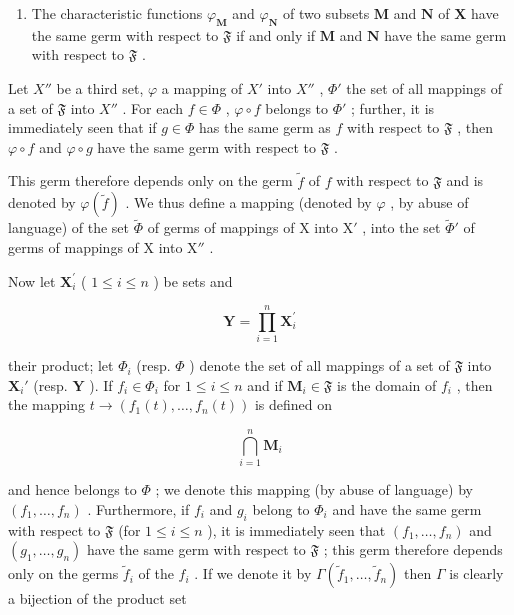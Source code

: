 \begin{enumerate}
\def\labelenumi{\arabic{enumi})}
\setcounter{enumi}{1}
\tightlist
\item
  The characteristic functions \(\varphi_{\mathbf{M}}\) and \(\varphi_{\mathbf{N}}\) of two subsets \(\mathbf{M}\) and \(\mathbf{N}\) of \(\mathbf{X}\) have the same germ with respect to \(\mathfrak{F}\) if and only if \(\mathbf{M}\) and \(\mathbf{N}\) have the same germ with respect to \(\mathfrak{F}\) .
\end{enumerate}

Let \(X''\) be a third set, \(\varphi\) a mapping of \(X'\) into \(X''\) , \(\Phi'\) the set of all mappings of a set of \(\mathfrak{F}\) into \(X''\) . For each \(f \in \Phi\) , \(\varphi \circ f\) belongs to \(\Phi'\) ; further, it is immediately seen that if \(g \in \Phi\) has the same germ as \(f\) with respect to \(\mathfrak{F}\) , then \(\varphi \circ f\) and \(\varphi \circ g\) have the same germ with respect to \(\mathfrak{F}\) .

This germ therefore depends only on the germ \(\tilde{f}\) of \(f\) with respect to \(\mathfrak{F}\) and is denoted by \(\varphi(\tilde{f})\) . We thus define a mapping (denoted by \(\varphi\) , by abuse of language) of the set \(\tilde{\Phi}\) of germs of mappings of X into \(\mathrm{X}'\) , into the set \(\tilde{\Phi}'\) of germs of mappings of X into \(\mathrm{X}''\) .

Now let \(\mathbf{X}_i^{\prime}\) ( \(1 \leqslant i \leqslant n\) ) be sets and

\[
\mathbf {Y} = \prod_ {i = 1} ^ {n} \mathbf {X} _ {i} ^ {\prime}
\]

their product; let \(\Phi_i\) (resp. \(\Phi\) ) denote the set of all mappings of a set of \(\mathfrak{F}\) into \(\mathbf{X}_i'\) (resp. \(\mathbf{Y}\) ). If \(f_i \in \Phi_i\) for \(1 \leqslant i \leqslant n\) and if \(\mathbf{M}_i \in \mathfrak{F}\) is the domain of \(f_i\) , then the mapping \(t \to (f_1(t), \ldots, f_n(t))\) is defined on

\[
\bigcap_ {i = 1} ^ {n} \mathbf {M} _ {i}
\]

and hence belongs to \(\Phi\) ; we denote this mapping (by abuse of language) by \((f_1, \ldots, f_n)\) . Furthermore, if \(f_i\) and \(g_i\) belong to \(\Phi_i\) and have the same germ with respect to \(\mathfrak{F}\) (for \(1 \leqslant i \leqslant n\) ), it is immediately seen that \((f_1, \ldots, f_n)\) and \((g_1, \ldots, g_n)\) have the same germ with respect to \(\mathfrak{F}\) ; this germ therefore depends only on the germs \(\tilde{f}_i\) of the \(f_i\) . If we denote it by \(\Gamma(\tilde{f}_1, \ldots, \tilde{f}_n)\) then \(\Gamma\) is clearly a bijection of the product set

